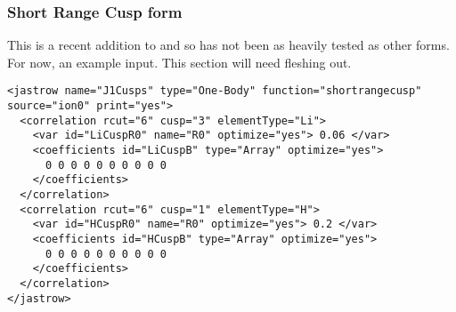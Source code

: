\subsubsection{Short Range Cusp form}
\label{sec:onebodyjastrowsrcusp}

This is a recent addition to \qmcpack and so has not been as heavily tested as other forms.
For now, an example input.
This section will need fleshing out.

\begin{lstlisting}[style=QMCPXML]
<jastrow name="J1Cusps" type="One-Body" function="shortrangecusp" source="ion0" print="yes">
  <correlation rcut="6" cusp="3" elementType="Li">
    <var id="LiCuspR0" name="R0" optimize="yes"> 0.06 </var>
    <coefficients id="LiCuspB" type="Array" optimize="yes">
      0 0 0 0 0 0 0 0 0 0
    </coefficients>
  </correlation>
  <correlation rcut="6" cusp="1" elementType="H">
    <var id="HCuspR0" name="R0" optimize="yes"> 0.2 </var>
    <coefficients id="HCuspB" type="Array" optimize="yes">
      0 0 0 0 0 0 0 0 0 0
    </coefficients>
  </correlation>
</jastrow>
\end{lstlisting}
